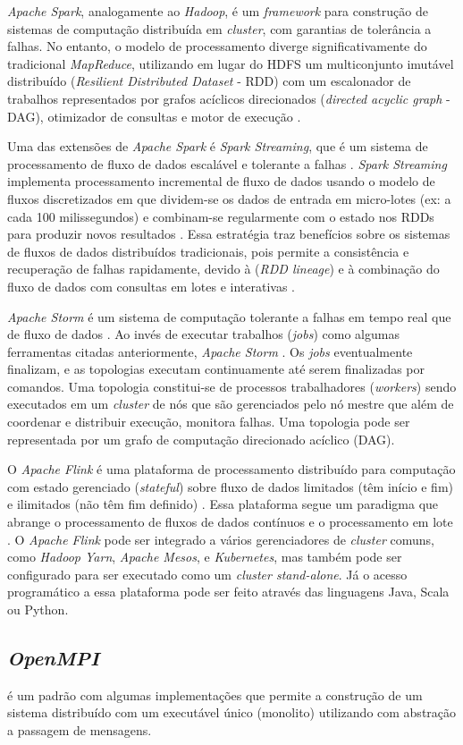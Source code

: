 \emph{Apache Spark}, analogamente ao \emph{Hadoop}, é um \emph{framework} para
construção de sistemas de computação distribuída em \emph{cluster}, com garantias
de tolerância a falhas.
No entanto, o modelo de processamento diverge
significativamente do tradicional \emph{MapReduce}, utilizando em lugar do HDFS
um multiconjunto imutável distribuído (\emph{Resilient Distributed Dataset}
- RDD) com um escalonador de trabalhos representados por grafos acíclicos
direcionados (\emph{directed acyclic graph} - DAG), otimizador de consultas e
motor de execução \cite{ApacheSpark2020}.

Uma das extensões de \emph{Apache Spark} é \emph{Spark Streaming}, que é um
sistema de processamento de fluxo de dados 
escalável e tolerante a falhas
\cite{zaharia2016,sparkStreaming2016}.
\emph{Spark Streaming} implementa processamento incremental de fluxo de
dados usando o modelo de fluxos discretizados em que dividem-se os dados de entrada
em micro-lotes (ex: a cada 100 milissegundos) e combinam-se regularmente com o
estado nos RDDs para produzir novos resultados \cite{zaharia2016}.
Essa estratégia traz benefícios sobre os sistemas de fluxos de dados distribuídos
tradicionais, pois permite a consistência e recuperação de falhas rapidamente,
devido à  (\emph{RDD lineage})
e à combinação do fluxo de dados com
consultas em lotes e interativas \cite{sparkStreaming2016,Lopez2018}.

\emph{Apache Storm} é um sistema de computação tolerante a falhas em tempo
real que  de fluxo de dados
\cite{ApacheStorm2020,Lopez2018}.
Ao invés de executar trabalhos (\emph{jobs}) como algumas ferramentas citadas
anteriormente, \emph{Apache Storm} .
Os \emph{jobs} eventualmente finalizam, e as topologias executam continuamente até
serem finalizadas por comandos.
Uma topologia constitui-se de processos trabalhadores (\emph{workers}) sendo executados
em um \emph{cluster} de nós que são gerenciados pelo nó mestre que além de
coordenar e distribuir execução, monitora falhas.
Uma topologia pode ser representada por um grafo de computação direcionado
acíclico (DAG).

O \emph{Apache Flink} é uma plataforma de processamento distribuído para
computação com estado gerenciado (\emph{stateful}) sobre fluxo de dados limitados (têm início e
fim) e ilimitados (não têm fim definido) \cite{ApacheFlink2020}.
Essa plataforma segue um paradigma que abrange o processamento de fluxos de
dados contínuos e o processamento em lote \cite{Carbone2015,Lopez2018}.
O \emph{Apache Flink} pode ser integrado a vários gerenciadores de \emph{cluster}
comuns, como \emph{Hadoop Yarn}, \emph{Apache Mesos}, e \emph{Kubernetes}, mas também pode ser
configurado para ser executado como um \emph{cluster stand-alone}.
Já o acesso programático a essa plataforma pode ser feito através das linguagens
Java, Scala ou Python.

\subsection{\emph{OpenMPI}}

\mpi é um padrão com algumas implementações que permite a construção de um
sistema distribuído com um executável único (monolito) utilizando com abstração
a passagem de mensagens.
